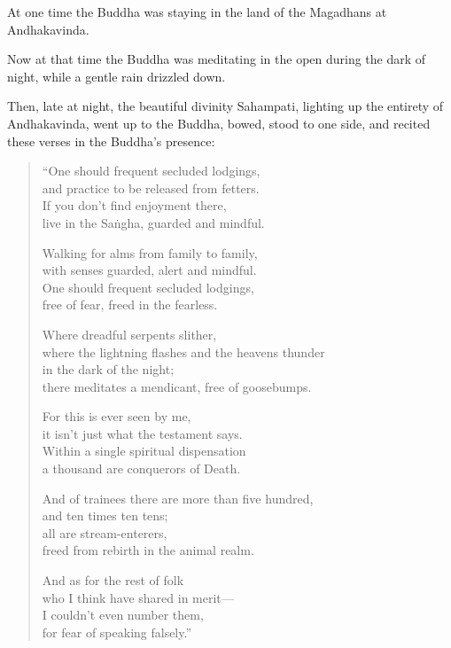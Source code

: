 \documentclass[12pt,openany]{book}%
\begin{document}
At one time the Buddha was staying in the land of the Magadhans at Andhakavinda. 

Now at that time the Buddha was meditating in the open during the dark of night, while a gentle rain drizzled down. 

Then, late at night, the beautiful divinity Sahampati, lighting up the entirety of Andhakavinda, went up to the Buddha, bowed, stood to one side, and recited these verses in the Buddha’s presence: 

\begin{verse}%
“One should frequent secluded lodgings, \\
and practice to be released from fetters. \\
If you don’t find enjoyment there, \\
live in the \textsanskrit{Saṅgha}, guarded and mindful. 

Walking for alms from family to family, \\
with senses guarded, alert and mindful. \\
One should frequent secluded lodgings, \\
free of fear, freed in the fearless. 

Where dreadful serpents slither, \\
where the lightning flashes and the heavens thunder \\
in the dark of the night; \\
there meditates a mendicant, free of goosebumps. 

For this is ever seen by me, \\
it isn’t just what the testament says. \\
Within a single spiritual dispensation \\
a thousand are conquerors of Death. 

And of trainees there are more than five hundred, \\
and ten times ten tens; \\
all are stream-enterers, \\
freed from rebirth in the animal realm. 

And as for the rest of folk \\
who I think have shared in merit—\\
I couldn’t even number them, \\
for fear of speaking falsely.” 

%
\end{verse}
\end{document}
